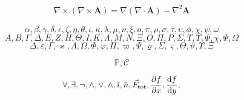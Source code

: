 \documentclass[../presentatie.tex]{subfiles}
\begin{document}
\begin{frame}
	
	\begin{align*}
		\nabla\times(\nabla\times\mathbf{A}) = \nabla(\nabla\cdot \mathbf{A}) - \nabla^2\mathbf{A}
	\end{align*}
\end{frame}

\begin{frame}
	
	\begin{equation*}
		\alpha,\beta,\gamma,\delta,\epsilon,\zeta,\eta,\theta,\iota,\kappa,\lambda,
		\mu,\nu,\xi,o,\pi,\rho,\sigma,\tau,\upsilon,\phi,\chi,\psi,\omega
	\end{equation*}
	\begin{equation*}
		A,B,\Gamma,\Delta,E,Z,H,\Theta,I,K,\Lambda,
		M,N,\Xi,O,\Pi,P,\Sigma,T,\Upsilon,\Phi,\chi,\Psi,\Omega
	\end{equation*}
	\begin{equation*}
		\varDelta,\varepsilon,\varGamma,\varkappa,\varLambda,%
		\varOmega,\varPhi,\varphi,\varPi,\varpi,%
		\varPsi,\varrho,
		\varSigma,\varsigma,\varTheta,\vartheta,%
		\varUpsilon,\varXi
	\end{equation*}

	
	\begin{equation}
		\mathbb{P}, \mathcal{C}
	\end{equation}
	
	\begin{equation}
		\forall, \exists, \lnot, \land, \lor, \wedge, \hat{\imath}, \hat{n}, \vec{F}_{\text{tot}},
		\frac{\partial f}{\partial x}, \frac{\dif f}{\dif y}, %
	\end{equation}
\end{frame}
\end{document}
